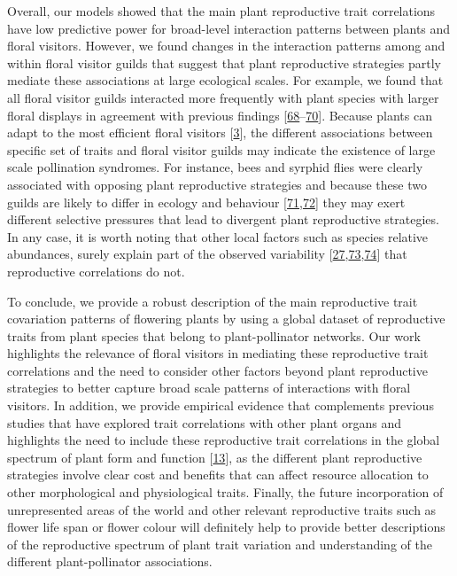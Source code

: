 \documentclass[
  12pt,
  a4paper,
]{article}
\begin{document}
Overall, our models showed that the main plant reproductive trait correlations have low predictive power for broad-level interaction patterns between plants and floral visitors. However, we found changes in the interaction patterns among and within floral visitor guilds that suggest that plant reproductive strategies partly mediate these associations at large ecological scales. For example, we found that all floral visitor guilds interacted more frequently with plant species with larger floral displays in agreement with previous findings {[}\protect\hyperlink{ref-hegland2005}{68}--\protect\hyperlink{ref-kaiser2014}{70}{]}. Because plants can adapt to the most efficient floral visitors {[}\protect\hyperlink{ref-fenster2004}{3}{]}, the different associations between specific set of traits and floral visitor guilds may indicate the existence of large scale pollination syndromes. For instance, bees and syrphid flies were clearly associated with opposing plant reproductive strategies and because these two guilds are likely to differ in ecology and behaviour {[}\protect\hyperlink{ref-rader2020}{71},\protect\hyperlink{ref-foldesi2021}{72}{]} they may exert different selective pressures that lead to divergent plant reproductive strategies. In any case, it is worth noting that other local factors such as species relative abundances, surely explain part of the observed variability {[}\protect\hyperlink{ref-bartomeus2016}{27},\protect\hyperlink{ref-vazquez2007}{73},\protect\hyperlink{ref-encinas2012}{74}{]} that reproductive correlations do not.

To conclude, we provide a robust description of the main reproductive trait covariation patterns of flowering plants by using a global dataset of reproductive traits from plant species that belong to plant-pollinator networks. Our work highlights the relevance of floral visitors in mediating these reproductive trait correlations and the need to consider other factors beyond plant reproductive strategies to better capture broad scale patterns of interactions with floral visitors. In addition, we provide empirical evidence that complements previous studies that have explored trait correlations with other plant organs and highlights the need to include these reproductive trait correlations in the global spectrum of plant form and function {[}\protect\hyperlink{ref-diaz2016}{13}{]}, as the different plant reproductive strategies involve clear cost and benefits that can affect resource allocation to other morphological and physiological traits. Finally, the future incorporation of unrepresented areas of the world and other relevant reproductive traits such as flower life span or flower colour will definitely help to provide better descriptions of the reproductive spectrum of plant trait variation and understanding of the different plant-pollinator associations.
\end{document}
